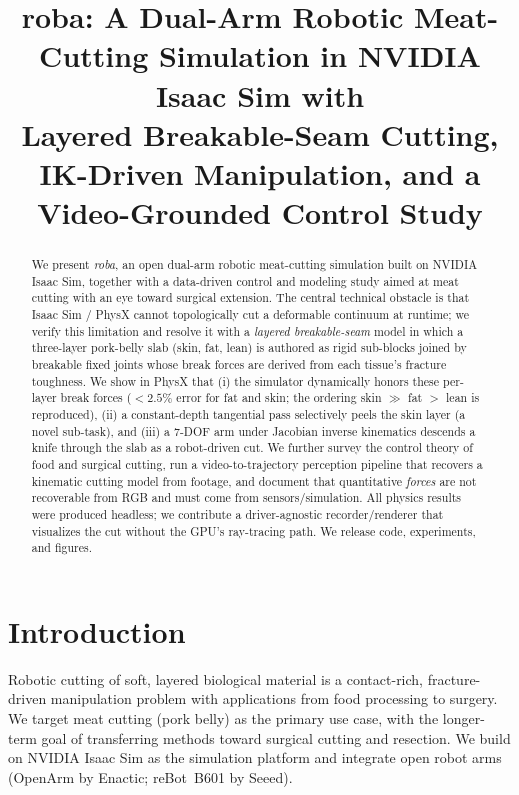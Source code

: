 \documentclass[conference]{IEEEtran}
\title{roba: A Dual-Arm Robotic Meat-Cutting Simulation in NVIDIA Isaac Sim with\\
Layered Breakable-Seam Cutting, IK-Driven Manipulation, and a Video-Grounded Control Study}
\author{\IEEEauthorblockN{T. Tang}\IEEEauthorblockA{Boston University \\ tztang@bu.edu}}
\begin{document}
\maketitle

\begin{abstract}
We present \emph{roba}, an open dual-arm robotic meat-cutting simulation built on NVIDIA Isaac Sim,
together with a data-driven control and modeling study aimed at meat cutting with an eye toward
surgical extension. The central technical obstacle is that Isaac Sim / PhysX cannot topologically cut
a deformable continuum at runtime; we verify this limitation and resolve it with a \emph{layered
breakable-seam} model in which a three-layer pork-belly slab (skin, fat, lean) is authored as rigid
sub-blocks joined by breakable fixed joints whose break forces are derived from each tissue's fracture
toughness. We show in PhysX that (i) the simulator dynamically honors these per-layer break forces
($<2.5\%$ error for fat and skin; the ordering skin $\gg$ fat $>$ lean is reproduced), (ii) a
constant-depth tangential pass selectively peels the skin layer (a novel sub-task), and (iii) a 7-DOF
arm under Jacobian inverse kinematics descends a knife through the slab as a robot-driven cut. We
further survey the control theory of food and surgical cutting, run a video-to-trajectory perception
pipeline that recovers a kinematic cutting model from footage, and document that quantitative
\emph{forces} are not recoverable from RGB and must come from sensors/simulation. All physics results
were produced headless; we contribute a driver-agnostic recorder/renderer that visualizes the cut
without the GPU's ray-tracing path. We release code, experiments, and figures.
\end{abstract}

\section{Introduction}
\label{sec:intro}
Robotic cutting of soft, layered biological material is a contact-rich, fracture-driven manipulation
problem with applications from food processing to surgery. We target meat cutting (pork belly) as the
primary use case, with the longer-term goal of transferring methods toward surgical cutting and
resection. We build on NVIDIA Isaac Sim as the simulation platform and integrate open robot arms
(OpenArm by Enactic; reBot~B601 by Seeed).
\end{document}
